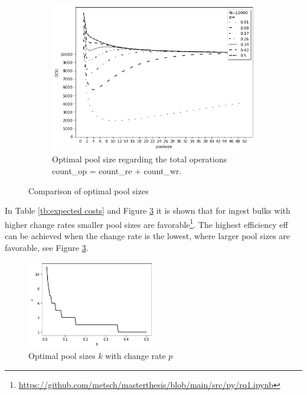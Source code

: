 \begin{figure}[t]
\begin{subfigure}{6cm}
        \includegraphics[width=\linewidth]{graphics/expected_operations.png}
        \caption{Optimal pool size regarding the total operations \acrshort{count_op} = \acrshort{count_re} + \acrshort{count_wr}.}\label{fig:expected_operations}
    \end{subfigure}
    \caption{Comparison of optimal pool sizes}
\end{figure}
In Table \ref{tb:expected costs} and Figure \ref{fig:poolsizes} it is shown that for ingest bulks with higher change rates smaller pool sizes are favorable\footnote{\url{https://github.com/metsch/masterthesis/blob/main/src/py/rq1.ipynb}}.
The highest efficiency \acrshort{eff} can be achieved when the change rate is the lowest, where larger pool sizes are favorable, see Figure \ref{fig:poolsizes}.
\begin{figure}[t]%
    \centering
    \includegraphics[width=0.5\textwidth]{graphics/poolsizes.png}
    \caption{Optimal pool sizes $k$ with change rate $p$}
    \label{fig:poolsizes}
\end{figure}
